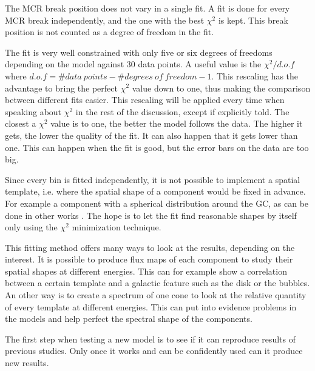 The MCR break position does not vary in a single fit. A fit is done for every MCR break independently, and the one with the best $\chi^2$ is kept. This break position is not counted as a degree of freedom in the fit.

The fit is very well constrained with only five or six degrees of freedoms depending on the model against 30 data points. A useful value is the $\chi^2 / d.o.f$ where $d.o.f = \#data\ points - \#degrees\ of\ freedom - 1$. This rescaling has the advantage to bring the perfect $\chi^2$ value down to one, thus making the comparison between different fits easier. This rescaling will be applied every time when speaking about $\chi^2$ in the rest of the discussion, except if explicitly told. 
The closest a $\chi^2$ value is to one, the better the model follows the data. The higher it gets, the lower the quality of the fit. It can also happen that it gets lower than one. This can happen when the fit is good, but the error bars on the data are too big.


Since every bin is fitted independently, it is not possible to implement a spatial template, i.e. where the spatial shape of a component would be fixed in advance. For example a component with a spherical distribution around the GC, as can be done in other works . The hope is to let the fit find reasonable shapes by itself only using the $\chi ^2$ minimization technique.




This fitting method offers many ways to look at the results, depending on the interest. It is possible to produce flux maps of each component to study their spatial shapes at different energies. This can for example show a correlation between a certain template and a galactic feature such as the disk or the bubbles. An other way is to create a spectrum of one cone to look at the relative quantity of every template at different energies. This can put into evidence problems in the models and help perfect the spectral shape of the components.

The first step when testing a new model is to see if it can reproduce results of previous studies. Only once it works and can be confidently used can it produce new results.




